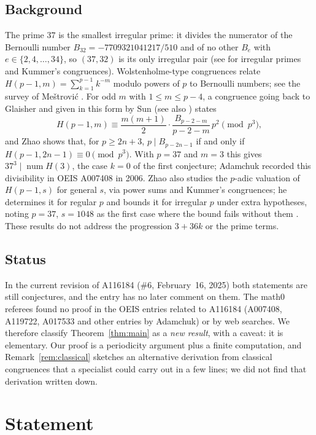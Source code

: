 \documentclass[11pt]{amsart}
\theoremstyle{plain}
\theoremstyle{definition}
\DeclareMathOperator{\num}{num}
\begin{document}
\subsection*{Background}
The prime $37$ is the smallest irregular prime: it divides the numerator of the Bernoulli number $B_{32}=-7709321041217/510$ and of no other $B_e$ with $e\in\{2,4,\dots,34\}$, so $(37,32)$ is its only irregular pair (see \cite{Wa} for irregular primes and Kummer's congruences). Wolstenholme-type congruences relate $H(p-1,m)=\sum_{k=1}^{p-1}k^{-m}$ modulo powers of $p$ to Bernoulli numbers; see the survey of Me\v{s}trovi\'c \cite{Me}. For odd $m$ with $1\le m\le p-4$, a congruence going back to Glaisher \cite{Gl} and given in this form by Sun \cite[Thm.~5.1(a)]{Su} (see also \cite[Result~4]{Le}) states
\[
  H(p-1,m)\equiv\frac{m(m+1)}{2}\cdot\frac{B_{p-2-m}}{p-2-m}\,p^2\pmod{p^3},
\]
and Zhao \cite[Thm.~2.8]{Zh} shows that, for $p\ge 2n+3$, $p\mid B_{p-2n-1}$ if and only if $H(p-1,2n-1)\equiv0\pmod{p^3}$. With $p=37$ and $m=3$ this gives $37^3\mid\num H(3)$, the case $k=0$ of the first conjecture; Adamchuk recorded this divisibility in OEIS A007408 \cite{A007408} in 2006. Zhao \cite[\S2.1]{Zh} also studies the $p$-adic valuation of $H(p-1,s)$ for general $s$, via power sums and Kummer's congruences; he determines it for regular $p$ and bounds it for irregular $p$ under extra hypotheses, noting $p=37$, $s=1048$ as the first case where the bound fails without them \cite[Rem.~2.6]{Zh}. These results do not address the progression $3+36k$ or the prime terms.

\subsection*{Status}
In the current revision of A116184 (\#6, February~16, 2025) both statements are still conjectures, and the entry has no later comment on them. The math0 referees found no proof in the OEIS entries related to A116184 (A007408, A119722, A017533 and other entries by Adamchuk) or by web searches. We therefore classify Theorem~\ref{thm:main} as a \emph{new result}, with a caveat: it is elementary. Our proof is a periodicity argument plus a finite computation, and Remark~\ref{rem:classical} sketches an alternative derivation from classical congruences that a specialist could carry out in a few lines; we did not find that derivation written down.

\section{Statement}\label{sec:statement}
\end{document}
